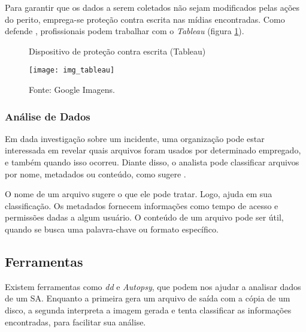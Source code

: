     \vspace{4mm}
    
    \hspace{1cm}
    Para garantir que os dados a serem coletados  não sejam modificados pelas ações do perito, emprega-se proteção contra escrita nas mídias encontradas. Como defende , profissionais podem trabalhar com o \textit{Tableau} (figura \ref{tableau_img}).
    
    \begin{figure}[H]
    	\centering
    	\caption{Dispositivo de proteção contra escrita (Tableau)}
    	\texttt{[image: img\_tableau]}
    	\caption*{Fonte: Google Imagens.}
    	\label{tableau_img}
    \end{figure}
    
    \subsubsection{Análise de Dados}
    
    \hspace{1cm}
    Em dada investigação sobre um incidente, uma organização pode estar interessada em revelar quais arquivos foram usados por determinado empregado, e também quando isso ocorreu. Diante disso, o analista pode classificar arquivos por nome, metadados ou conteúdo, como sugere .
    
    \vspace{4mm}
    
    \hspace{1cm}
    O nome de um arquivo sugere o que ele pode tratar. Logo, ajuda em sua classificação. Os metadados fornecem informações como tempo de acesso e permissões dadas a algum usuário. O conteúdo de um arquivo pode ser útil, quando se busca uma palavra-chave ou formato específico.
    
    \subsection{Ferramentas} \label{cap2_ferramentas}
    
    \hspace{1cm}
    Existem ferramentas como \textit{dd} e \textit{Autopsy}, que podem nos ajudar a analisar dados de um SA. Enquanto a primeira gera um arquivo de saída com a cópia de um disco, a segunda interpreta a imagem gerada e tenta classificar as informações encontradas, para facilitar sua análise.
    
